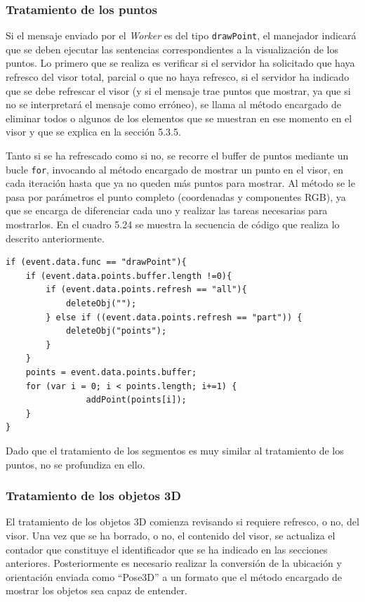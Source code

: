 \subsubsection{Tratamiento de los puntos}
Si el mensaje enviado por el \textit{Worker} es del tipo \texttt{drawPoint}, el manejador indicará que se deben ejecutar las sentencias correspondientes a la visualización de los puntos. Lo primero que se realiza es verificar si el servidor ha solicitado que haya refresco del visor total, parcial o que no haya refresco, si el servidor ha indicado que se debe refrescar el visor (y si el mensaje trae puntos que mostrar, ya que si no se interpretará el mensaje como erróneo), se llama al método encargado de eliminar todos o algunos de los elementos que se muestran en ese momento en el visor y que se explica en la sección 5.3.5. 

Tanto si se ha refrescado como si no, se recorre el buffer de puntos mediante un bucle \texttt{for}, invocando al método encargado de mostrar un punto en el visor, en cada iteración hasta que ya no queden más puntos para mostrar. Al método se le pasa por parámetros el punto completo (coordenadas y componentes RGB), ya que se encarga de diferenciar cada uno y realizar las tareas necesarias para mostrarlos. En el cuadro 5.24 se muestra la secuencia de código que realiza lo descrito anteriormente.

\begin{lstlisting}[caption= Código para tratar los mensajes con los puntos, label=cod.tratarpuntos]
if (event.data.func == "drawPoint"){
	if (event.data.points.buffer.length !=0){
		if (event.data.points.refresh == "all"){
			deleteObj("");
		} else if ((event.data.points.refresh == "part")) {
			deleteObj("points");
		}
	}
	points = event.data.points.buffer;
	for (var i = 0; i < points.length; i+=1) {
        		addPoint(points[i]);
	}
}
 \end{lstlisting}

Dado que el tratamiento de los segmentos es muy similar al tratamiento de los puntos, no se profundiza en ello.

\subsubsection{Tratamiento de los objetos 3D}
El tratamiento de los objetos 3D comienza revisando si requiere refresco, o no, del visor. Una vez que se ha borrado, o no, el contenido del visor, se actualiza el contador que constituye el identificador que se ha indicado en las secciones anteriores. Posteriormente es necesario realizar la conversión de la ubicación y orientación enviada como ``Pose3D'' a un formato que el método encargado de mostrar los objetos sea capaz de entender.

